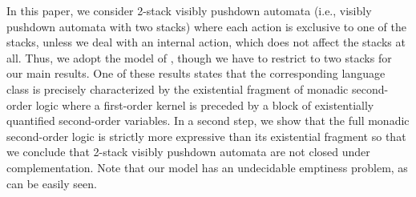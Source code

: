 \documentclass{LMCS}
\begin{document}
In this paper, we consider 2-stack visibly pushdown automata (i.e., visibly
pushdown automata with two stacks) where each action is exclusive to one of
the stacks, unless we deal with an internal action, which does not affect the
stacks at all. Thus, we adopt the model of \cite{Madhusudan2007}, though we
have to restrict to two stacks for our main results. One of these results
states that the corresponding language class is precisely characterized by the
existential fragment of monadic second-order logic where a first-order kernel
is preceded by a block of existentially quantified second-order variables. In
a second step, we show that the full monadic second-order logic is strictly
more expressive than its existential fragment so that we conclude that 2-stack
visibly pushdown automata are not closed under complementation. Note that our
model has an undecidable emptiness problem, as can be easily seen.
\end{document}

